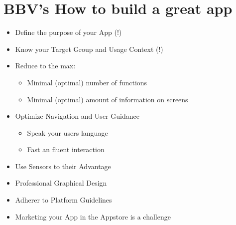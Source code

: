 \section{BBV's How to build a great app}

\begin{breakbox}
\begin{itemize}
\tightlist
\item
  Define the purpose of your App (!)
\item
  Know your Target Group and Usage Context (!)
\item
  Reduce to the max:

  \begin{itemize}
  \tightlist
  \item
    Minimal (optimal) number of functions
  \item
    Minimal (optimal) amount of information on screens
  \end{itemize}
\item
  Optimize Navigation and User Guidance

  \begin{itemize}
  \tightlist
  \item
    Speak your users language
  \item
    Fast an fluent interaction
  \end{itemize}
\item
  Use Sensors to their Advantage
\item
  Professional Graphical Design
\item
  Adherer to Platform Guidelines
\item
  Marketing your App in the Appstore is a challenge
\end{itemize}

\end{breakbox}
